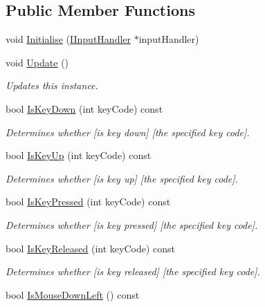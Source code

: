 \subsection*{Public Member Functions}
\begin{DoxyCompactItemize}
\item 
void \hyperlink{class_input_manager_af93398faf21d795debc76b79ad2d5201}{Initialise} (\hyperlink{class_i_input_handler}{I\+Input\+Handler} $\ast$input\+Handler)
\item 
void \hyperlink{class_input_manager_aa5480931dba2720e7d80dd00a53adae0}{Update} ()
\begin{DoxyCompactList}\small\item\em Updates this instance. \end{DoxyCompactList}\item 
bool \hyperlink{class_input_manager_aea5fcd05a755cd08dea87daab3b877ed}{Is\+Key\+Down} (int key\+Code) const 
\begin{DoxyCompactList}\small\item\em Determines whether \mbox{[}is key down\mbox{]} \mbox{[}the specified key code\mbox{]}. \end{DoxyCompactList}\item 
bool \hyperlink{class_input_manager_ae0ba18a9ccbc1de2ab20b110fb96a2e4}{Is\+Key\+Up} (int key\+Code) const 
\begin{DoxyCompactList}\small\item\em Determines whether \mbox{[}is key up\mbox{]} \mbox{[}the specified key code\mbox{]}. \end{DoxyCompactList}\item 
bool \hyperlink{class_input_manager_a0bb7417608ed9f4a9e5d27f3f65b7af7}{Is\+Key\+Pressed} (int key\+Code) const 
\begin{DoxyCompactList}\small\item\em Determines whether \mbox{[}is key pressed\mbox{]} \mbox{[}the specified key code\mbox{]}. \end{DoxyCompactList}\item 
bool \hyperlink{class_input_manager_a8ca0de87bf6b06e42329adad0475f70a}{Is\+Key\+Released} (int key\+Code) const 
\begin{DoxyCompactList}\small\item\em Determines whether \mbox{[}is key released\mbox{]} \mbox{[}the specified key code\mbox{]}. \end{DoxyCompactList}\item 
bool \hyperlink{class_input_manager_a4e89e13b8b49be92a5f50c6c117a6ea9}{Is\+Mouse\+Down\+Left} () const 

\end{DoxyCompactItemize}
